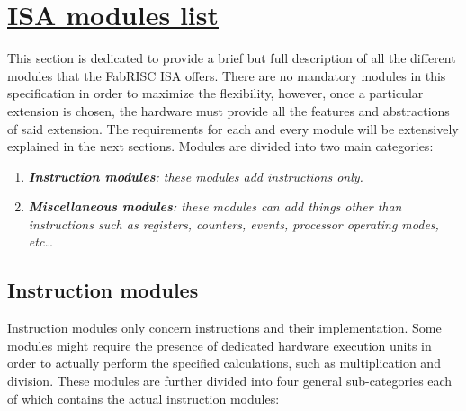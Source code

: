 \section[ISA modules list]{\LARGE\underline{ISA modules list}}

    \vspace{10pt}

    This section is dedicated to provide a brief but full description of all the different modules that the FabRISC ISA offers. There are no mandatory modules in this specification in order to maximize the flexibility, however, once a particular extension is chosen, the hardware must provide all the features and abstractions of said extension. The requirements for each and every module will be extensively explained in the next sections. Modules are divided into two main categories:

    \begin{enumerate}

        \item \textit{\textbf{Instruction modules}: these modules add instructions only.}

        \item \textit{\textbf{Miscellaneous modules}: these modules can add things other than instructions such as registers, counters, events, processor operating modes, etc\ldots}

    \end{enumerate}

    \subsection{Instruction modules}

        Instruction modules only concern instructions and their implementation. Some modules might require the presence of dedicated hardware execution units in order to actually perform the specified calculations, such as multiplication and division. These modules are further divided into four general sub-categories each of which contains the actual instruction modules:

